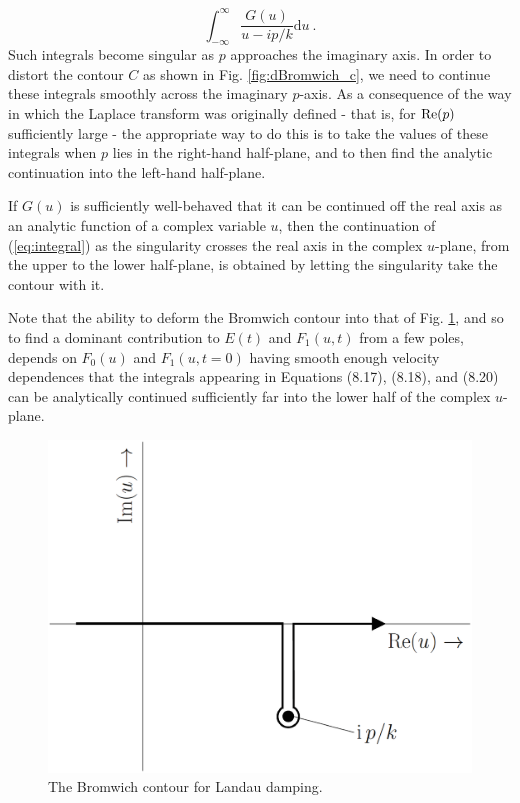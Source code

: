 \documentclass[12pt,a4paper]{article}
\newcommand{\dif}{\mathrm{d}}
\begin{document}
\begin{equation}
\int_{-\infty}^\infty \dfrac{G(u)}{u-ip/k} \dif u ~.
\label{eq:integral}
\end{equation}
Such integrals become singular as $p$ approaches the imaginary axis. In order to distort the contour $C$ as shown in Fig. \ref{fig:dBromwich_c}, we need to continue these integrals smoothly across the imaginary $p$-axis. As a consequence of the way in which the Laplace transform was originally defined - that is, for ${\rm Re}(p)$ sufficiently large - the appropriate way to do this is to take the values of these integrals when $p$ lies in the right-hand half-plane, and to then find the analytic continuation into the left-hand half-plane. 
 
If $G(u)$ is sufficiently well-behaved that it can be continued off the real axis as an analytic function of a complex variable $u$, then the continuation of (\ref{eq:integral}) as the singularity crosses the real axis in the complex $u$-plane, from the upper to the lower half-plane, is obtained by letting the singularity take the contour with it.
 
Note that the ability to deform the Bromwich contour into that of Fig. \ref{fig:Bromwich_cLandau}, and so to find a dominant contribution to $E(t)$ and $F_1(u, t)$ from a few poles, depends on $F_0(u)$ and $F_1(u,t = 0)$ having smooth enough velocity dependences that the integrals appearing in Equations (8.17), (8.18), and (8.20) can be analytically continued sufficiently far into the lower half of the complex $u$-plane. 

\begin{figure}
\centering
\includegraphics[height=8.cm, angle=0]{Bromwich_contour_for_Landau_damping.eps}
\caption{
The Bromwich contour for Landau damping.
}
\label{fig:Bromwich_cLandau}
\end{figure}
\end{document}
